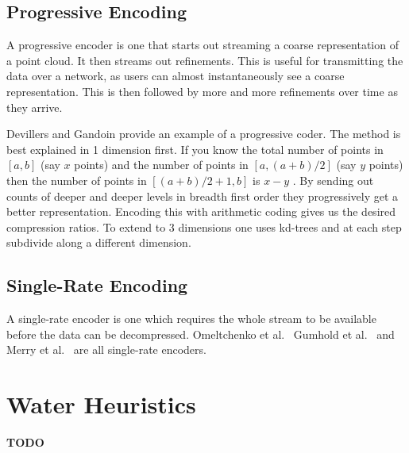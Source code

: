 \documentclass{report}
\begin{document}
\subsection{Progressive Encoding}

A progressive encoder is one that starts out streaming a coarse representation
of a point cloud. It then streams out refinements. This is useful for
transmitting the data over a network, as users can almost instantaneously see
a coarse representation. This is then followed by more and more refinements
over time as they arrive.

Devillers and Gandoin \cite{devillers2000gci} provide an example of a
progressive coder. The method is best explained in 1 dimension first. If you
know the total number of points in $[a, b]$ (say $x$ points) and the number of
points in $[a, (a+b)/2]$ (say $y$ points) then the number of points in
$[(a+b)/2+1, b]$ is $x - y$ . By sending out counts of deeper and deeper
levels in breadth first order they progressively get a better
representation. Encoding this with arithmetic coding gives us the desired
compression ratios. To extend to 3 dimensions one uses kd-trees and at each
step subdivide along a different dimension.


\subsection{Single-Rate Encoding}

A single-rate encoder is one which requires the whole stream to be available
before the data can be decompressed. Omeltchenko et
al.~\cite{omeltchenko2000sls} Gumhold et al.~\cite{gumholdcomp} and Merry et
al.~\cite{merrycomp} are all single-rate encoders.


\section{Water Heuristics}

\textbf{TODO}

\end{document}
